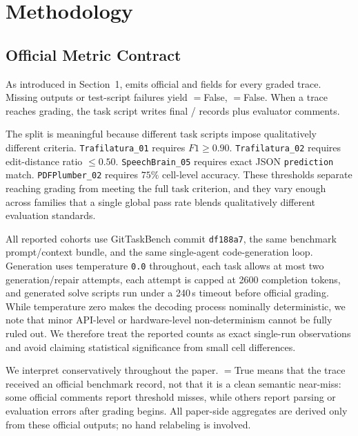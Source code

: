 \section{Methodology}

\subsection{Official Metric Contract}

As introduced in Section~1, \gittaskbench emits official \processmetric and
\resultmetric fields for every graded trace. Missing outputs or test-script
failures yield \processmetric$=$False, \resultmetric$=$False. When a trace
reaches grading, the task script writes final \processmetric/\resultmetric
records plus evaluator comments.

The split is meaningful because different task scripts impose qualitatively
different criteria. \texttt{Trafilatura\_01} requires $F1 \ge 0.90$.
\texttt{Trafilatura\_02} requires edit-distance ratio $\le 0.50$.
\texttt{SpeechBrain\_05} requires exact JSON \texttt{prediction} match.
\texttt{PDFPlumber\_02} requires $75\%$ cell-level accuracy. These thresholds
separate reaching grading from meeting the full task criterion, and they vary
enough across families that a single global pass rate blends qualitatively
different evaluation standards.

All reported cohorts use GitTaskBench commit \texttt{df188a7}, the same
benchmark prompt/context bundle, and the same single-agent code-generation
loop. Generation uses temperature \texttt{0.0} throughout, each task allows at
most two generation/repair attempts, each attempt is capped at 2600 completion
tokens, and generated solve scripts run under a 240\,s timeout before official
grading. While temperature zero makes the decoding process nominally
deterministic, we note that minor API-level or hardware-level
non-determinism cannot be fully ruled out. We therefore treat the reported
counts as exact single-run observations and avoid claiming statistical
significance from small cell differences.

We interpret \processmetric conservatively throughout the paper.
\processmetric$=$True means that the trace received an official benchmark
record, not that it is a clean semantic near-miss: some official comments
report threshold misses, while others report parsing or evaluation errors after
grading begins. All paper-side aggregates are derived only from these official
outputs; no hand relabeling is involved.

